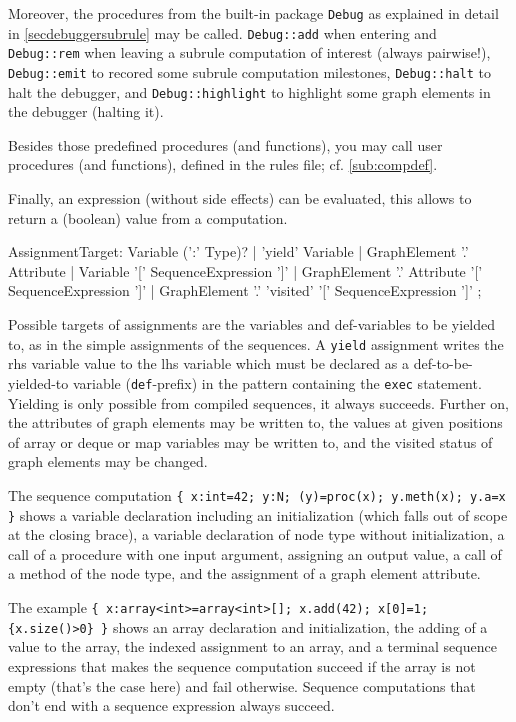 Moreover, the procedures from the built-in package \texttt{Debug} as explained in detail in \ref{secdebuggersubrule} may be called.
\texttt{Debug::add} when entering and \texttt{Debug::rem} when leaving a subrule computation of interest (always pairwise!),
\texttt{Debug::emit} to recored some subrule computation milestones, \texttt{Debug::halt} to halt the debugger, and \texttt{Debug::highlight} to highlight some graph elements in the debugger (halting it).

Besides those predefined procedures (and functions), you may call user procedures (and functions), defined in the rules file; cf. \ref{sub:compdef}.

Finally, an expression (without side effects) can be evaluated, this allows to return a (boolean) value from a computation.

\begin{rail}
  AssignmentTarget: 
    Variable (':' Type)? |
    'yield' Variable |
    GraphElement '.' Attribute |
    Variable '[' SequenceExpression ']' |
    GraphElement '.' Attribute '[' SequenceExpression ']' |
    GraphElement '.' 'visited' '[' SequenceExpression ']'
;
\end{rail}

Possible targets of assignments are the variables and def-variables to be yielded to, as in the simple assignments of the sequences. 
A \texttt{yield} assignment writes the rhs variable value to the lhs variable which must be declared as a  def-to-be-yielded-to variable (\texttt{def}-prefix) in the pattern containing the \texttt{exec} statement.
Yielding is only possible from compiled sequences, it always succeeds.
Further on, the attributes of graph elements may be written to, the values at given positions of array or deque or map variables may be written to, and the visited status of graph elements may be changed.

\begin{example}
The sequence computation \verb#{ x:int=42; y:N; (y)=proc(x); y.meth(x); y.a=x }# shows a variable declaration including an initialization (which falls out of scope at the closing brace), a variable declaration of node type without initialization, a call of a procedure with one input argument, assigning an output value, a call of a method of the node type, and the assignment of a graph element attribute.

The example \verb#{ x:array<int>=array<int>[]; x.add(42); x[0]=1; {x.size()>0} }# shows an array declaration and initialization, the adding of a value to the array, the indexed assignment to an array, and a terminal sequence expressions that makes the sequence computation succeed if the array is not empty (that's the case here) and fail otherwise. Sequence computations that don't end with a sequence expression always succeed.
\end{example}

